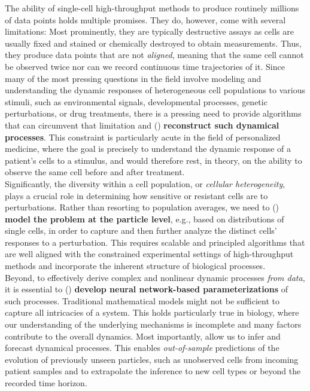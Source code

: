 The ability of single-cell high-throughput methods to produce routinely millions of data points holds multiple promises. They do, however, come with several limitations: 
 Most prominently, they are typically destructive assays as cells are usually fixed and stained or chemically destroyed to obtain measurements. Thus, they produce data points that are not \textit{aligned}, meaning that the same cell cannot be observed twice nor can we record continuous time trajectories of it.
Since many of the most pressing questions in the field involve modeling and understanding the dynamic responses of heterogeneous cell populations to various stimuli, such as environmental signals, developmental processes, genetic perturbations, or drug treatments, there is a pressing need to provide algorithms that can circumvent that limitation and () \textbf{reconstruct such dynamical processes}. 
This constraint is particularly acute in the field of personalized medicine, where the goal is precisely to understand the dynamic response of a patient's cells to a stimulus, and would therefore rest, in theory, on the ability to observe the same cell before and after treatment. \\

Significantly, the diversity within a cell population, or \textit{cellular heterogeneity}, plays a crucial role in determining how sensitive or resistant cells are to perturbations.
Rather than resorting to population averages, we need to () \textbf{model the problem at the particle level}, e.g., based on distributions of single cells, in order to capture and then further analyze the distinct cells' responses to a perturbation. 
This requires scalable and principled algorithms that are well aligned with the constrained experimental settings of high-throughput methods and incorporate the inherent structure of biological processes. \\

Beyond, to effectively derive complex and nonlinear dynamic processes \textit{from data}, it is essential to () \textbf{develop neural network-based parameterizations} of such processes.
Traditional mathematical models might not be sufficient to capture all intricacies of a system. This holds particularly true in biology, where our understanding of the underlying mechanisms is incomplete and many factors contribute to the overall dynamics.
Most importantly,  allow us to infer and forecast dynamical processes. This enables \emph{out-of-sample} predictions of the evolution of previously unseen particles, such as unobserved cells from incoming patient samples and to extrapolate the inference to new cell types or beyond the recorded time horizon. \\

